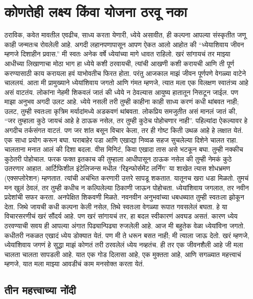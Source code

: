 \chapter{कोणतेही लक्ष्य किंवा योजना ठरवू नका}
ठराविक, कवेत मावतील एवढीच, साध्य करता येणारी, ध्येये असावीत, ही कल्पना आपल्या संस्कृतीत जणू काही जन्मतःच रोवलेली आहे. अगदी लहानपणापासून आपण ऐकत आलो आहोत की “ध्येयाशिवाय जीवन म्हणजे दिशाहीन प्रवास.” मी स्वतः अनेक वर्षे ध्येयांच्या मागे धावत राहिलो. खरं सांगायचं तर माझ्या आधीच्या लिखाणाचा मोठा भाग हा ध्येये कशी ठरवायची, त्यांची आखणी कशी करायची आणि ती पूर्ण करण्यासाठी काय करायला हवं याभोवतीच फिरत होता.
परंतु आजकाल माझं जीवन पूर्णपणे वेगळ्या वाटेने चाललयं. आता मी प्रामुख्याने ध्येयांशिवाय जगतो आणि गंमत म्हणजे, त्यात मला एक विलक्षण स्वातंत्र्य आहे असं वाटतंय. लोकांना नेहमी शिकवलं जातं की ध्येये न ठेवल्यास आयुष्य हातातून निसटून जाईल. पण माझा अनुभव अगदी उलट आहे. ध्येये नसली तरी तुम्ही काहीना काही साध्य करणं कधी थांबवत नाही; उलट, तुम्ही स्वतःला कृत्रिम मर्यादांमध्ये अडकवणं थांबवता.
लोकप्रिय समजुतीत असं मानलं जातं की,  “जर तुम्हाला कुठे जायचं आहे हे ठाऊक नसेल, तर तुम्ही कुठेच पोहोचणार नाही”. पहिल्यांदा ऐकल्यावर हे अगदीच तर्कसंगत वाटतं. पण जर शांत बसून विचार केला, तर ही गोष्ट किती उथळ आहे हे लक्षात येतं. एक साधा प्रयोग करून बघा. घराबाहेर पडा आणि एखाद्या निव्वळ सहज सुचलेल्या दिशेने चालत राहा. चालताना मनात आलं की दिशा बदला. वीस मिनिटं, किवा एखादा तास असे भटकून बघा. तुम्ही नक्कीच कुठेतरी पोहोचाल. फरक फक्त इतकाच की तुम्हाला आधीपासून ठाऊक नसेल की तुम्ही नेमकं कुठे उतरणार आहात. आर्टिफिशील इंटेलिजन्स मधील ‘रिइन्फोर्समेंट लर्निंग’ या शाखेत त्यास शोधभ्रमण (एक्सप्लोरेशन) म्हणतात. त्यांची अचंभित करणारी उत्तरे सापडू शकतात. 
यातूनच खरा धडा मिळतो. तुमचं मन खुलं ठेवलं, तर तुम्ही कधीच न कल्पिलेल्या ठिकाणी जाऊन पोहोचता. ध्येयांशिवाय जगलात, तर नवीन प्रदेशांची सफर करता. अनपेक्षित शिकवणी मिळते. नवनवीन अनुभवांच्या धबधब्यात तुम्ही स्वतःला झोकून देता. जिथे जायची कधी कल्पना केली नसेल, तिथे स्वतःला वेगळ्या रूपात गवसलेलं बघता. हे या विचारसरणीचं खरं सौंदर्य आहे. पण खरं सांगायचं तर, हा बदल स्वीकारणं अवघड असतं. कारण ध्येय ठरवण्याची सवय ही आपल्या अंगात पिढ्यान्पिढ्या रुजलेली आहे.
आज मी बहुतेक वेळा ध्येयांविना जगतो. कधीतरी नकळत एखादं ध्येय डोक्यात येतं. पण मी ते धरून बसत नाही; मी त्याला जाऊ देतो. खरं म्हणजे, ध्येयांशिवाय जगणं हे सुद्धा माझं कोणतं तरी ठरवलेलं ध्येय नव्हतंच. ही तर एक जीवनशैली आहे जी मला चालता चालता सापडली आहे. यात एक गोड दिलासा आहे, एक मुक्तता आहे, आणि सगळ्यात महत्त्वाचं म्हणजे,  यात मला माझ्या आवडीचं काम मनसोक्त करता येतं.

\section*{तीन महत्त्वाच्या नोंदी}


